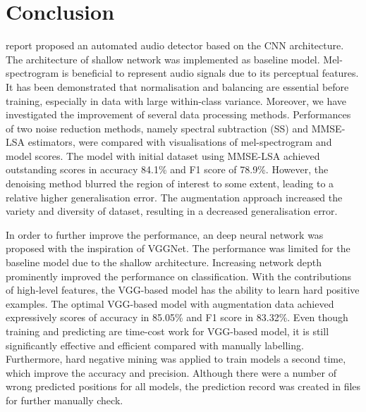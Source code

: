 \chapter{Conclusion}
\renewcommand{\baselinestretch}{\mystretch}
\label{chap:Conclusion}
 report proposed an automated audio detector based on the CNN architecture. The architecture of shallow network was implemented as baseline model. Mel-spectrogram is beneficial to represent audio signals due to its perceptual features.
It has been demonstrated that normalisation and balancing are essential before training, especially in data with large within-class variance. Moreover, we have investigated the improvement of several data processing methods. Performances of two noise reduction methods, namely spectral subtraction (SS) and MMSE-LSA estimators, were compared with visualisations of mel-spectrogram and model scores. The model with initial dataset using MMSE-LSA achieved outstanding scores in accuracy 84.1\% and F1 score of 78.9\%. However, the denoising method blurred the region of interest to some extent, leading to a relative higher generalisation error. The augmentation approach increased the variety and diversity of dataset, resulting in a decreased generalisation error. 

In order to further improve the performance, an deep neural network was proposed with the inspiration of VGGNet. The performance was limited for the baseline model due to the shallow architecture. Increasing network depth prominently improved the performance on classification. With the contributions of high-level features, the VGG-based model has the ability to learn hard positive examples. The optimal VGG-based model with augmentation data achieved expressively scores of accuracy in 85.05\% and F1 score in 83.32\%.  Even though training and predicting are time-cost work for VGG-based model, it is still significantly effective and efficient compared with manually labelling. Furthermore, hard negative mining was applied to train models a second time, which improve the accuracy and precision. Although there were a number of wrong predicted positions for all models, the prediction record was created in files for further manually check.
